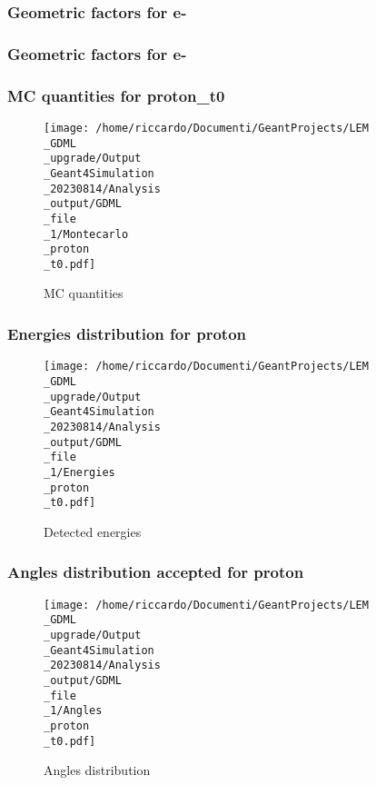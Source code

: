 \documentclass[8pt]{beamer}
\begin{document}
            \begin{frame}
                \frametitle{Geometric factors for e-}
            
            \end{frame}
            
            \begin{frame}
                \frametitle{Geometric factors for e-}
            
            \end{frame}
            
            \begin{frame}
                \frametitle{MC quantities for proton\_t0}
            
        \begin{figure}[h]
            \centering
            \texttt{[image: /home/riccardo/Documenti/GeantProjects/LEM\\\_GDML\\\_upgrade/Output\\\_Geant4Simulation\\\_20230814/Analysis\\\_output/GDML\\\_file\\\_1/Montecarlo\\\_proton\\\_t0.pdf]}
            \caption{MC quantities}
        \end{figure}
        
            \end{frame}
            
            \begin{frame}
                \frametitle{Energies distribution for proton}
            
        \begin{figure}[h]
            \centering
            \texttt{[image: /home/riccardo/Documenti/GeantProjects/LEM\\\_GDML\\\_upgrade/Output\\\_Geant4Simulation\\\_20230814/Analysis\\\_output/GDML\\\_file\\\_1/Energies\\\_proton\\\_t0.pdf]}
            \caption{Detected energies}
        \end{figure}
        
            \end{frame}
            
            \begin{frame}
                \frametitle{Angles distribution accepted for proton}
            
        \begin{figure}[h]
            \centering
            \texttt{[image: /home/riccardo/Documenti/GeantProjects/LEM\\\_GDML\\\_upgrade/Output\\\_Geant4Simulation\\\_20230814/Analysis\\\_output/GDML\\\_file\\\_1/Angles\\\_proton\\\_t0.pdf]}
            \caption{Angles distribution}
        \end{figure}
        
            \end{frame}
            
\end{document}
